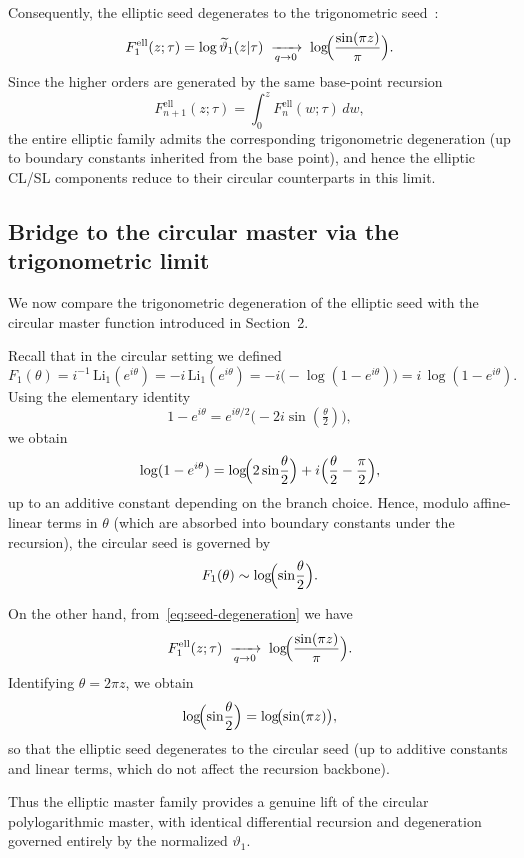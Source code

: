 \documentclass[11pt]{article}
\begin{document}
Consequently, the elliptic seed degenerates to the trigonometric seed~\cite{DLMF}:
\begin{equation}\label{eq:seed-degeneration}
F^{\mathrm{ell}}_1(z;\tau)
=
\log\widetilde{\vartheta}_1(z|\tau)
\;\xrightarrow[q\to0]{}\;
\log\!\Bigl(\frac{\sin(\pi z)}{\pi}\Bigr).
\end{equation}
Since the higher orders are generated by the same base-point recursion
\[
F^{\mathrm{ell}}_{n+1}(z;\tau)=\int_0^z F^{\mathrm{ell}}_n(w;\tau)\,dw,
\]
the entire elliptic family admits the corresponding trigonometric degeneration
(up to boundary constants inherited from the base point), and hence the
elliptic CL/SL components reduce to their circular counterparts in this limit.


\subsection{Bridge to the circular master via the trigonometric limit}

We now compare the trigonometric degeneration of the elliptic seed
with the circular master function introduced in Section~2.

Recall that in the circular setting we defined
\[
F_1(\theta)
=
i^{-1}\,\mathrm{Li}_1(e^{i\theta})
=
-i\,\mathrm{Li}_1(e^{i\theta})
=
-i\bigl(-\log(1-e^{i\theta})\bigr)
=
i\,\log(1-e^{i\theta}).
\]
Using the elementary identity
\[
1-e^{i\theta}
=
e^{i\theta/2}\bigl(-2i\sin(\tfrac{\theta}{2})\bigr),
\]
we obtain
\[
\log(1-e^{i\theta})
=
\log\!\Bigl(2\sin\!\frac{\theta}{2}\Bigr)
+
i\Bigl(\frac{\theta}{2}-\frac{\pi}{2}\Bigr),
\]
up to an additive constant depending on the branch choice.
Hence, modulo affine-linear terms in $\theta$ (which are absorbed
into boundary constants under the recursion),
the circular seed is governed by
\[
F_1(\theta)
\sim
\log\!\Bigl(\sin\!\frac{\theta}{2}\Bigr).
\]

On the other hand, from~\eqref{eq:seed-degeneration} we have~\cite{DLMF}
\[
F^{\mathrm{ell}}_1(z;\tau)
\;\xrightarrow[q\to0]{}\;
\log\!\Bigl(\frac{\sin(\pi z)}{\pi}\Bigr).
\]
Identifying $\theta=2\pi z$, we obtain
\[
\log\!\Bigl(\sin\!\frac{\theta}{2}\Bigr)
=
\log\!\bigl(\sin(\pi z)\bigr),
\]
so that the elliptic seed degenerates to the circular seed
(up to additive constants and linear terms, which do not affect the
recursion backbone).

Thus the elliptic master family provides a genuine lift of the
circular polylogarithmic master, with identical differential recursion
and degeneration governed entirely by the normalized $\vartheta_1$.
\end{document}
